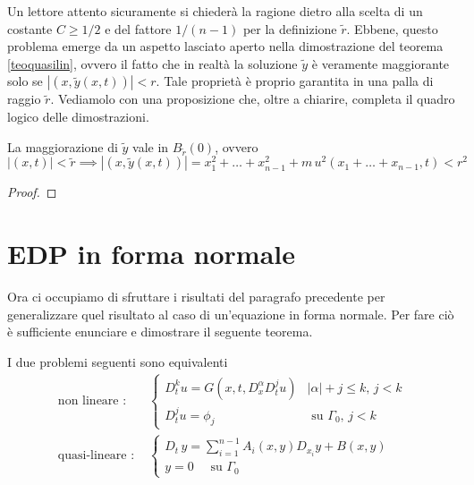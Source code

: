Un lettore attento sicuramente si chiederà la ragione dietro alla scelta di un costante $C\geq 1/2$ e del fattore $1/(n-1)$ per la definizione $\widetilde{r}$. Ebbene, questo problema emerge da un aspetto lasciato aperto nella dimostrazione del teorema \ref{teoquasilin}, ovvero il fatto che in realtà la soluzione $\widetilde{y}$ è veramente maggiorante solo se $|(x,\widetilde{y}(x,t))|< r$. Tale proprietà è proprio garantita in una palla di raggio $\widetilde{r}$. Vediamolo con una proposizione che, oltre a chiarire, completa il quadro logico delle dimostrazioni.
\begin{namedtheorem}[Proposizione]
La maggiorazione di $\widetilde{y}$ vale in $B_{\widetilde{r}}(0)$, ovvero
$$|(x,t)|<\widetilde{r} \implies |(x,\widetilde{y}(x,t))|=x_1^2 + \ldots + x_{n-1}^2 + m \, u^2(x_1 + \ldots + x_{n-1},t) < r^2$$
\end{namedtheorem}
\begin{proof}

\end{proof}

\newpage
\section{EDP in forma normale}
Ora ci occupiamo di sfruttare i risultati del paragrafo precedente per generalizzare quel risultato al caso di un'equazione in forma normale. Per fare ciò è sufficiente enunciare e dimostrare il seguente teorema.
\begin{theorem}\label{teonorm}
I due problemi seguenti sono equivalenti
\begin{align*}
\text{non lineare : }&
\begin{cases}
D_{t}^k u = G(x,t, D^\alpha_x D^j_t u) & |\alpha |+ j \leq k, \, j<k \\
D_t^ju = \phi_j & \text{ su } \Gamma_0, \, j<k
\end{cases} \\
\text{quasi-lineare : }&
\begin{cases}
D_t \, y = \sum\limits_{i=1}^{n-1} A_i(x,y)D_{x_i}y+B(x,y) \; \\
y=0 \quad \text{ su } \Gamma_0
\end{cases}
\end{align*}
\end{theorem}

